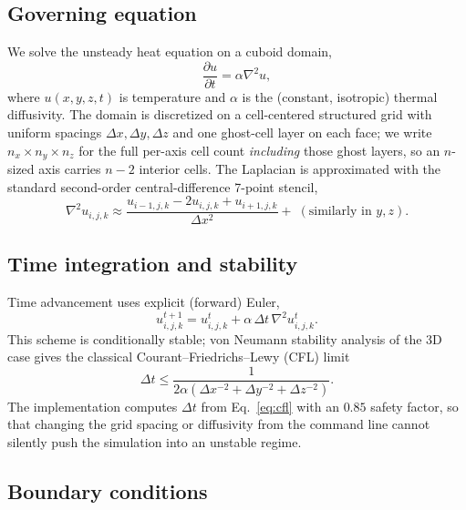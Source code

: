 \documentclass[conference]{IEEEtran}
\begin{document}
\subsection{Governing equation}

We solve the unsteady heat equation on a cuboid domain,
\begin{equation}
  \frac{\partial u}{\partial t} = \alpha \nabla^2 u,
\end{equation}
where $u(x,y,z,t)$ is temperature and $\alpha$ is the (constant, isotropic) thermal
diffusivity. The domain is discretized on a cell-centered structured grid with uniform
spacings $\Delta x, \Delta y, \Delta z$ and one ghost-cell layer on each face; we
write $n_x \times n_y \times n_z$ for the full per-axis cell count \emph{including}
those ghost layers, so an $n$-sized axis carries $n-2$ interior cells. The
Laplacian is approximated with the standard second-order central-difference 7-point
stencil,
\begin{equation}
  \nabla^2 u_{i,j,k} \approx
    \frac{u_{i-1,j,k} - 2u_{i,j,k} + u_{i+1,j,k}}{\Delta x^2} + \;(\text{similarly in } y, z).
\end{equation}

\subsection{Time integration and stability}

Time advancement uses explicit (forward) Euler,
\begin{equation}
  u_{i,j,k}^{t+1} = u_{i,j,k}^{t} + \alpha\,\Delta t \, \nabla^2 u_{i,j,k}^{t}.
\end{equation}
This scheme is conditionally stable; von Neumann stability analysis
\cite{obrien1950} of the 3D case gives the classical Courant--Friedrichs--Lewy (CFL)
limit \cite{courant1928}
\begin{equation}
  \Delta t \leq \frac{1}{2\alpha\left(\Delta x^{-2} + \Delta y^{-2} + \Delta z^{-2}\right)}.
  \label{eq:cfl}
\end{equation}
The implementation computes $\Delta t$ from Eq.~\eqref{eq:cfl} with an $0.85$ safety
factor, so that changing the grid spacing or diffusivity from the command line cannot
silently push the simulation into an unstable regime.

\subsection{Boundary conditions}
\end{document}
